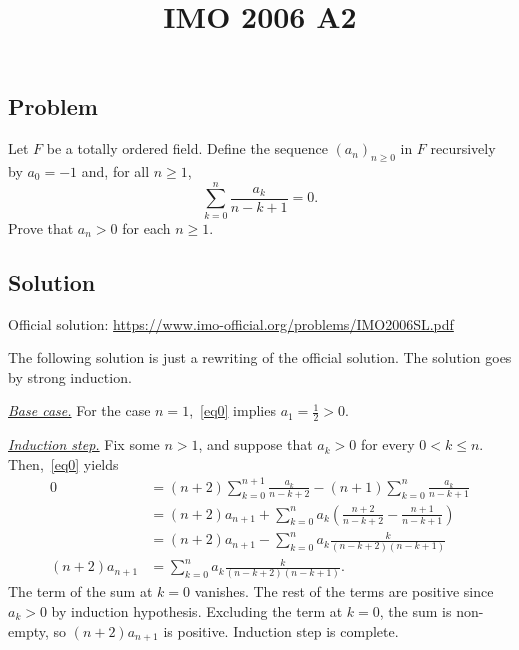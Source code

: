 \documentclass{article}
\title{IMO 2006 A2}
\author{}
\date{}
\begin{document}
\maketitle



\subsection*{Problem}

Let $F$ be a totally ordered field.
Define the sequence $(a_n)_{n \geq 0}$ in $F$ recursively by $a_0 = -1$ and, for all $n \geq 1$,
\[ \sum_{k = 0}^n \frac{a_k}{n - k + 1} = 0. \tag{*}\label{eq0} \]
Prove that $a_n > 0$ for each $n \geq 1$.



\subsection*{Solution}

Official solution: \url{https://www.imo-official.org/problems/IMO2006SL.pdf}

The following solution is just a rewriting of the official solution.
The solution goes by strong induction.

\textit{\underline{Base case.}}
For the case $n = 1$,~\eqref{eq0} implies $a_1 = \frac{1}{2} > 0$.

\textit{\underline{Induction step.}}
Fix some $n > 1$, and suppose that $a_k > 0$ for every $0 < k \leq n$.
Then,~\eqref{eq0} yields
\begin{align*}
0
    &= (n + 2) \sum_{k = 0}^{n + 1} \frac{a_k}{n - k + 2} - (n + 1) \sum_{k = 0}^n \frac{a_k}{n - k + 1} \\
    &= (n + 2) a_{n + 1} + \sum_{k = 0}^n a_k \left(\frac{n + 2}{n - k + 2} - \frac{n + 1}{n - k + 1}\right) \\
    &= (n + 2) a_{n + 1} - \sum_{k = 0}^n a_k \frac{k}{(n - k + 2)(n - k + 1)} \\
(n + 2) a_{n + 1}
    &= \sum_{k = 0}^n a_k \frac{k}{(n - k + 2)(n - k + 1)}.
\end{align*}
The term of the sum at $k = 0$ vanishes.
The rest of the terms are positive since $a_k > 0$ by induction hypothesis.
Excluding the term at $k = 0$, the sum is non-empty, so $(n + 2) a_{n + 1}$ is positive.
Induction step is complete.
\end{document}

